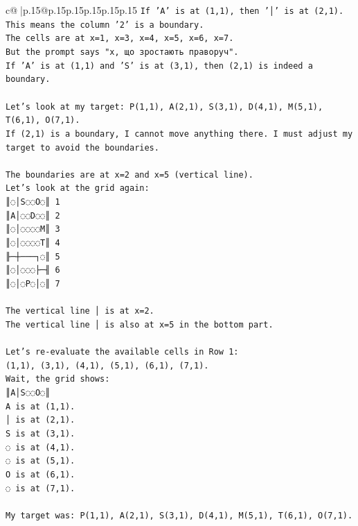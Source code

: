 \documentclass{article}
\begin{document}
{\begin{supertabular}{c@{$\;$}|p{.15\linewidth}@{}p{.15\linewidth}p{.15\linewidth}p{.15\linewidth}p{.15\linewidth}p{.15\linewidth}}
{{{\texttt{If 'A' is at (1,1), then '│' is at (2,1). This means the column '2' is a boundary.} \\
\texttt{The cells are at x=1, x=3, x=4, x=5, x=6, x=7.} \\
\texttt{But the prompt says "x, що зростають праворуч".} \\
\texttt{If 'A' is at (1,1) and 'S' is at (3,1), then (2,1) is indeed a boundary.} \\
\\ 
\texttt{Let's look at my target: P(1,1), A(2,1), S(3,1), D(4,1), M(5,1), T(6,1), O(7,1).} \\
\texttt{If (2,1) is a boundary, I cannot move anything there. I must adjust my target to avoid the boundaries.} \\
\\ 
\texttt{The boundaries are at x=2 and x=5 (vertical line).} \\
\texttt{Let's look at the grid again:} \\
\texttt{║◌│S◌◌O◌║ 1} \\
\texttt{║A│◌◌D◌◌║ 2} \\
\texttt{║◌│◌◌◌◌M║ 3} \\
\texttt{║◌│◌◌◌◌T║ 4} \\
\texttt{╟─┼───┐◌║ 5} \\
\texttt{║◌│◌◌◌├─╢ 6} \\
\texttt{║◌│◌P◌│◌║ 7} \\
\\ 
\texttt{The vertical line │ is at x=2.} \\
\texttt{The vertical line │ is also at x=5 in the bottom part.} \\
\\ 
\texttt{Let's re{-}evaluate the available cells in Row 1:} \\
\texttt{(1,1), (3,1), (4,1), (5,1), (6,1), (7,1).} \\
\texttt{Wait, the grid shows:} \\
\texttt{║A│S◌◌O◌║} \\
\texttt{A is at (1,1).} \\
\texttt{│ is at (2,1).} \\
\texttt{S is at (3,1).} \\
\texttt{◌ is at (4,1).} \\
\texttt{◌ is at (5,1).} \\
\texttt{O is at (6,1).} \\
\texttt{◌ is at (7,1).} \\
\\ 
\texttt{My target was: P(1,1), A(2,1), S(3,1), D(4,1), M(5,1), T(6,1), O(7,1).} \\
}}}
\end{supertabular}}
\end{document}
